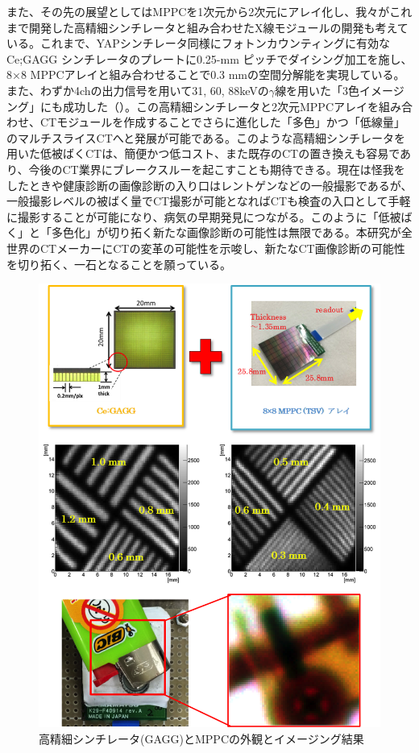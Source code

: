 また、その先の展望としてはMPPCを1次元から2次元にアレイ化し、我々がこれまで開発した高精細シンチレータと組み合わせたX線モジュールの開発も考えている。これまで、YAPシンチレータ同様にフォトンカウンティングに有効なCe;GAGG シンチレータのプレートに0.25-mm ピッチでダイシング加工を施し、8×8 MPPCアレイと組み合わせることで0.3 mmの空間分解能を実現している。また、わずか4chの出力信号を用いて31, 60, 88keVの$\gamma$線を用いた「3色イメージング」にも成功した（）。この高精細シンチレータと2次元MPPCアレイを組み合わせ、CTモジュールを作成することでさらに進化した「多色」かつ「低線量」のマルチスライスCTへと発展が可能である。このような高精細シンチレータを用いた低被ばくCTは、簡便かつ低コスト、また既存のCTの置き換えも容易であり、今後のCT業界にブレークスルーを起こすことも期待できる。現在は怪我をしたときや健康診断の画像診断の入り口はレントゲンなどの一般撮影であるが、一般撮影レベルの被ばく量でCT撮影が可能となればCTも検査の入口として手軽に撮影することが可能になり、病気の早期発見につながる。このように「低被ばく」と「多色化」が切り拓く新たな画像診断の可能性は無限である。本研究が全世界のCTメーカーにCTの変革の可能性を示唆し、新たなCT画像診断の可能性を切り拓く、一石となることを願っている。



\begin{figure}[H]
 \begin{center}
 \includegraphics[bb=0.000000 0.000000 400.766870 520.276990,width=1\hsize]{image2/chapter5/oshimaetal.png} 
 \end{center}
 \caption{高精細シンチレータ(GAGG)とMPPCの外観とイメージング結果\cite{oshima_etal}}
 \label{fig:oshimaetal}
\end{figure}

